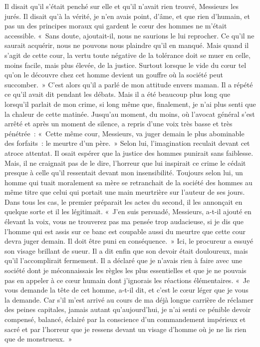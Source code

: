 \documentclass[french,twoside]{book} %
\begin{document}
Il disait qu’il s’était penché sur elle et qu’il n’avait rien trouvé, Messieurs les jurés. Il disait qu’à la vérité, je n’en avais point, d’âme, et que rien d’humain, et pas un des principes moraux qui gardent le cœur des hommes ne m’était accessible. « Sans doute, ajoutait-il, nous ne saurions le lui reprocher. Ce qu’il ne saurait acquérir, nous ne pouvons nous plaindre qu’il en manqué. Mais quand il s’agit de cette cour, la vertu toute négative de la tolérance doit se muer en celle, moins facile, mais plus élevée, de la justice. Surtout lorsque le vide du cœur tel qu’on le découvre chez cet homme devient un gouffre où la société peut succomber. » C'est alors qu’il a parlé de mon attitude envers maman. Il a répété ce qu’il avait dit pendant les débats. Mais il a été beaucoup plus long que lorsqu’il parlait de mon crime, si long même que, finalement, je n’ai plus senti que la chaleur de cette matinée. Jusqu’au moment, du moins, où l’avocat général s’est arrêté et après un moment de silence, a repris d’une voix très basse et très pénétrée : « Cette même cour, Messieurs, va juger demain le plus abominable des forfaits : le meurtre d’un père. » Selon lui, l’imagination reculait devant cet atroce attentat. Il osait espérer que la justice des hommes punirait sans faiblesse. Mais, il ne craignait pas de le dire, l’horreur que lui inspirait ce crime le cédait presque à celle qu’il ressentait devant mon insensibilité. Toujours selon lui, un homme qui tuait moralement sa mère se retranchait de la société des hommes au même titre que celui qui portait une main meurtrière sur l’auteur de ses jours. Dans tous les cas, le premier préparait les actes du second, il les annonçait en quelque sorte et il les légitimait. « J'en suis persuadé, Messieurs, a-t-il ajouté en élevant la voix, vous ne trouverez pas ma pensée trop audacieuse, si je dis que l’homme qui est assis sur ce banc est coupable aussi du meurtre que cette cour devra juger demain. Il doit être puni en conséquence. » Ici, le procureur a essuyé son visage brillant de sueur. Il a dit enfin que son devoir était douloureux, mais qu’il l’accomplirait fermement. Il a déclaré que je n’avais rien à faire avec une société dont je méconnaissais les règles les plus essentielles et que je ne pouvais pas en appeler à ce cœur humain dont j’ignorais les réactions élémentaires. « Je vous demande la tête de cet homme, a-t-il dit, et c’est le cœur léger que je vous la demande. Car s’il m’est arrivé au cours de ma déjà longue carrière de réclamer des peines capitales, jamais autant qu’aujourd’hui, je n’ai senti ce pénible devoir compensé, balancé, éclairé par la conscience d’un commandement impérieux et sacré et par l’horreur que je ressens devant un visage d’homme où je ne lis rien que de monstrueux. »\par
\end{document}
